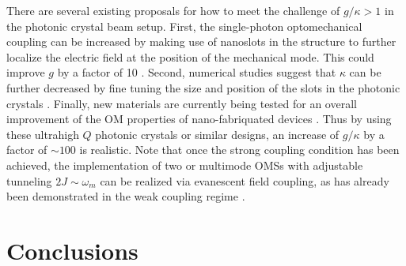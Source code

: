 There are several existing
proposals for how to meet the challenge
of $g/\kappa > 1$ 
in the photonic crystal beam setup.
First, 
the single-photon optomechanical coupling can 
be increased by making use of
nanoslots in the structure \cite{Robinson2005, Davanc2012} 
to further localize the electric field at 
the position of the mechanical mode.
This could improve $g$ by a factor of 10
\cite{Ludwig2012}.
Second, numerical studies 
suggest that $\kappa$ can be further decreased
by fine tuning the size and position of the slots in
the photonic crystals \cite{Notomi2008,Tanaka2008}. 
Finally, new materials are currently being tested for an 
overall improvement of the OM properties of nano-fabriquated devices \cite{Xiong2012}.
Thus by using these ultrahigh $Q$ photonic crystals or 
similar designs, an increase of $g/\kappa$ by a factor of $\sim 100$ 
is realistic. 
Note that once the strong coupling condition has been achieved, 
the implementation of two or multimode OMSs 
with adjustable tunneling $2J\sim \omega_m$ can be realized via evanescent field
coupling, as has already been demonstrated in the weak coupling regime
\cite{Safavi-Naeini2011a, Eichenfield2009, Grudinin2010}.






\section{Conclusions}
\label{sect:Conclusion}


